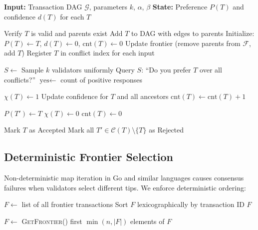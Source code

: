 \documentclass[11pt,a4paper]{article}
\begin{document}
\begin{algorithm}
\caption{Prism: DAG Conflict Resolution}
\begin{algorithmic}[1]
\STATE \textbf{Input:} Transaction DAG $\mathcal{G}$, parameters $k$, $\alpha$, $\beta$
\STATE \textbf{State:} Preference $P(T)$ and confidence $d(T)$ for each $T$

    \STATE Verify $T$ is valid and parents exist
    \STATE Add $T$ to DAG with edges to parents
    \STATE Initialize: $P(T) \gets T$, $d(T) \gets 0$, $\text{cnt}(T) \gets 0$
    \STATE Update frontier (remove parents from $\mathcal{F}$, add $T$)
    \STATE Register $T$ in conflict index for each input
\ENDPROCEDURE

        \STATE $S \gets$ Sample $k$ validators uniformly
        \STATE Query $S$: ``Do you prefer $T$ over all conflicts?''
        \STATE $\text{yes} \gets$ count of positive responses

            \STATE $\chi(T) \gets 1$
            \STATE Update confidence for $T$ and all ancestors
            \STATE $\text{cnt}(T) \gets \text{cnt}(T) + 1$

                    \STATE $P(T') \gets T$ 
                \ENDIF
            \ENDFOR
        \ELSE
            \STATE $\chi(T) \gets 0$
            \STATE $\text{cnt}(T) \gets 0$
        \ENDIF

            \STATE Mark $T$ as Accepted
            \STATE Mark all $T' \in \mathcal{C}(T) \setminus \{T\}$ as Rejected
        \ENDIF
    \ENDFOR
\ENDPROCEDURE
\end{algorithmic}
\end{algorithm}

\subsection{Deterministic Frontier Selection}

Non-deterministic map iteration in Go and similar languages causes consensus failures when validators select different tips. We enforce deterministic ordering:

\begin{algorithm}
\caption{Deterministic Frontier Selection}
\begin{algorithmic}[1]
    \STATE $F \gets$ list of all frontier transactions
    \STATE Sort $F$ lexicographically by transaction ID
    \RETURN $F$
\ENDFUNCTION

    \STATE $F \gets$ \textsc{GetFrontier}()
    \RETURN first $\min(n, |F|)$ elements of $F$
\ENDFUNCTION
\end{algorithmic}
\end{algorithm}
\end{document}
